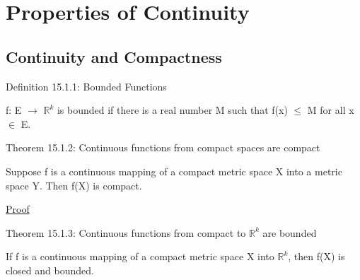 \newpage

\section[Day 15: Continuity Properties]{Properties of Continuity}

\subsection{ Continuity and Compactness }

{ \color{blue} Definition 15.1.1: Bounded Functions }

    \begin{adjustbox}{minipage=14cm, right, vspace=0.1cm 0cm}
        f: E $\rightarrow$ $\mathbb{R}^k$ is bounded if there is a
        real number M such that f(x) $\leq$ M for all x $\in$ E.
    \end{adjustbox}

    \vspace{0.5cm}

{ \color{red} Theorem 15.1.2:
Continuous functions from compact spaces are compact }

    \begin{adjustbox}{minipage=14cm, right, vspace=0.1cm 0cm}
        Suppose f is a continuous mapping of a compact metric space X
        into a metric space Y. Then f(X) is compact.
    \end{adjustbox}

{ \color{magenta} \underline{Proof} }


    \vspace{0.5cm}

{ \color{red} Theorem 15.1.3:
Continuous functions from compact to $\mathbb{R}^k$ are bounded }

    \begin{adjustbox}{minipage=14cm, right, vspace=0.1cm 0cm}
        If f is a continuous mapping of a compact metric space X into $\mathbb{R}^k$,
        then f(X) is closed and bounded. 
    \end{adjustbox}

